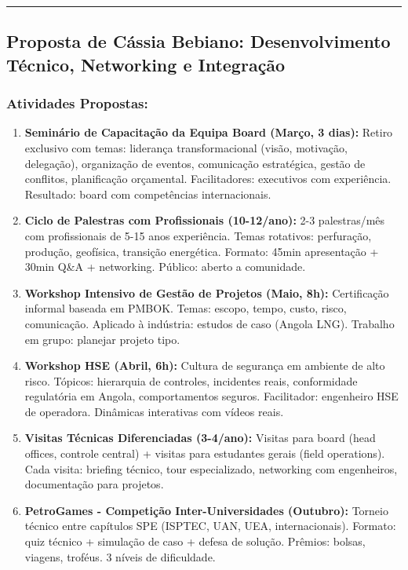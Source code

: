 \documentclass[12pt,a4paper]{article}
\begin{document}
\textcolor{spe-secondary}{\hspace{0.5cm}\rule{0.4\linewidth}{0.8pt}}
\subsection{Proposta de Cássia Bebiano: Desenvolvimento Técnico, Networking e Integração}

\subsubsection*{Atividades Propostas:}

\begin{enumerate}[itemsep=0.2cm]
    \item \textbf{Seminário de Capacitação da Equipa Board (Março, 3 dias):} Retiro exclusivo com temas: liderança transformacional (visão, motivação, delegação), organização de eventos, comunicação estratégica, gestão de conflitos, planificação orçamental. Facilitadores: executivos com experiência. Resultado: board com competências internacionais.
    
    \item \textbf{Ciclo de Palestras com Profissionais (10-12/ano):} 2-3 palestras/mês com profissionais de 5-15 anos experiência. Temas rotativos: perfuração, produção, geofísica, transição energética. Formato: 45min apresentação + 30min Q\&A + networking. Público: aberto a comunidade.
    
    \item \textbf{Workshop Intensivo de Gestão de Projetos (Maio, 8h):} Certificação informal baseada em PMBOK. Temas: escopo, tempo, custo, risco, comunicação. Aplicado à indústria: estudos de caso (Angola LNG). Trabalho em grupo: planejar projeto tipo.
    
    \item \textbf{Workshop HSE (Abril, 6h):} Cultura de segurança em ambiente de alto risco. Tópicos: hierarquia de controles, incidentes reais, conformidade regulatória em Angola, comportamentos seguros. Facilitador: engenheiro HSE de operadora. Dinâmicas interativas com vídeos reais.
    
    \item \textbf{Visitas Técnicas Diferenciadas (3-4/ano):} Visitas para board (head offices, controle central) + visitas para estudantes gerais (field operations). Cada visita: briefing técnico, tour especializado, networking com engenheiros, documentação para projetos.
    
    \item \textbf{PetroGames - Competição Inter-Universidades (Outubro):} Torneio técnico entre capítulos SPE (ISPTEC, UAN, UEA, internacionais). Formato: quiz técnico + simulação de caso + defesa de solução. Prêmios: bolsas, viagens, troféus. 3 níveis de dificuldade.
    

\end{enumerate}
\end{document}
